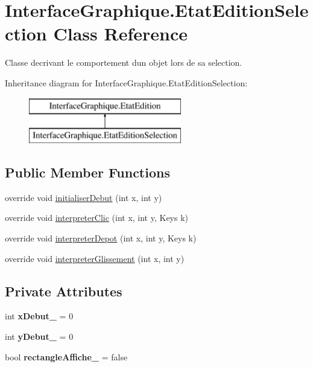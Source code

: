 \hypertarget{class_interface_graphique_1_1_etat_edition_selection}{}\section{Interface\+Graphique.\+Etat\+Edition\+Selection Class Reference}
\label{class_interface_graphique_1_1_etat_edition_selection}


Classe decrivant le comportement d\textquotesingle{}un objet lors de sa selection.  


Inheritance diagram for Interface\+Graphique.\+Etat\+Edition\+Selection\+:\begin{figure}[H]
\begin{center}
\leavevmode
\includegraphics[height=2.000000cm]{class_interface_graphique_1_1_etat_edition_selection}
\end{center}
\end{figure}
\subsection*{Public Member Functions}
\begin{DoxyCompactItemize}
\item 
override void \hyperlink{group__inf2990_ga8a2180a8469534f3e433b38171a01997}{initialiser\+Debut} (int x, int y)
\item 
override void \hyperlink{group__inf2990_gad79f5a52db7e3a5c284e14757e123959}{interpreter\+Clic} (int x, int y, Keys k)
\item 
override void \hyperlink{group__inf2990_gaf541d3e99c5c6aa6ba426b5c4837a2e1}{interpreter\+Depot} (int x, int y, Keys k)
\item 
override void \hyperlink{group__inf2990_ga7c967ae93f9be63db88d8a4396376b2a}{interpreter\+Glissement} (int x, int y)
\end{DoxyCompactItemize}
\subsection*{Private Attributes}
\begin{DoxyCompactItemize}
\item 
int {\bfseries x\+Debut\+\_\+} = 0
\item 
int {\bfseries y\+Debut\+\_\+} = 0
\item 
bool {\bfseries rectangle\+Affiche\+\_\+} = false
\end{DoxyCompactItemize}

